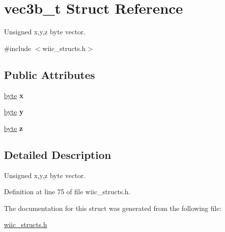\hypertarget{structvec3b__t}{\section{vec3b\-\_\-t \-Struct \-Reference}
\label{structvec3b__t}
}


\-Unsigned x,y,z byte vector.  




{\ttfamily \#include $<$wiic\-\_\-structs.\-h$>$}

\subsection*{\-Public \-Attributes}
\begin{DoxyCompactItemize}
\item 
\hypertarget{structvec3b__t_a5295b93ff596c418bdb337dff3eb7a64}{\hyperlink{wiic__macros_8h_a0c8186d9b9b7880309c27230bbb5e69d}{byte} {\bfseries x}}\label{structvec3b__t_a5295b93ff596c418bdb337dff3eb7a64}

\item 
\hypertarget{structvec3b__t_a0536602fe878b4451f453b640b08c6cc}{\hyperlink{wiic__macros_8h_a0c8186d9b9b7880309c27230bbb5e69d}{byte} {\bfseries y}}\label{structvec3b__t_a0536602fe878b4451f453b640b08c6cc}

\item 
\hypertarget{structvec3b__t_a1d1d231306c68e30c41fb0340e78d603}{\hyperlink{wiic__macros_8h_a0c8186d9b9b7880309c27230bbb5e69d}{byte} {\bfseries z}}\label{structvec3b__t_a1d1d231306c68e30c41fb0340e78d603}

\end{DoxyCompactItemize}


\subsection{\-Detailed \-Description}
\-Unsigned x,y,z byte vector. 

\-Definition at line 75 of file wiic\-\_\-structs.\-h.



\-The documentation for this struct was generated from the following file\-:\begin{DoxyCompactItemize}
\item 
\hyperlink{wiic__structs_8h}{wiic\-\_\-structs.\-h}\end{DoxyCompactItemize}
